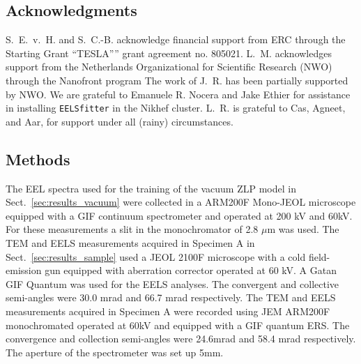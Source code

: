 \subsection*{Acknowledgments}
%
S.~E.~v.~H. and S.~C.-B. acknowledge financial support
from ERC through the Starting Grant ``TESLA”'' grant agreement
no. 805021.
%
L.~M. acknowledges support from the
Netherlands Organizational for Scientific Research (NWO)
through the Nanofront program
%
The work of J.~R. has been partially supported by NWO.
%
We are grateful to Emanuele R. Nocera and Jake Ethier for
assistance in installing {\tt EELSfitter} in the Nikhef cluster.
%
L.~R. is grateful to Cas, Agneet, and Aar, for support under all 
(rainy) circumstances.



\subsection*{Methods}

The EEL spectra used for the training of the vacuum ZLP model in
Sect.~\ref{sec:results_vacuum} were collected in a ARM200F Mono-JEOL microscope equipped
with a GIF continuum spectrometer and operated at 200 kV and 60kV. For these measurements
a slit in the monochromator of 2.8 $\mu$m was used.
%
The TEM and EELS measurements acquired in Specimen A in
Sect.~\ref{sec:results_sample} used a JEOL 2100F microscope with a cold field-emission
gun equipped with aberration corrector operated at 60 kV. A Gatan GIF Quantum was used for
the EELS analyses. The convergent and collective semi-angles were 30.0 mrad and 66.7 mrad respectively.
%
The TEM and EELS measurements acquired in Specimen A
were recorded using JEM ARM200F monochromated operated at 60kV and equipped with
a GIF quantum ERS. The convergence and collection semi-angles were 24.6mrad and 58.4 mrad respectively.
The aperture of the spectrometer was set up 5mm. 
